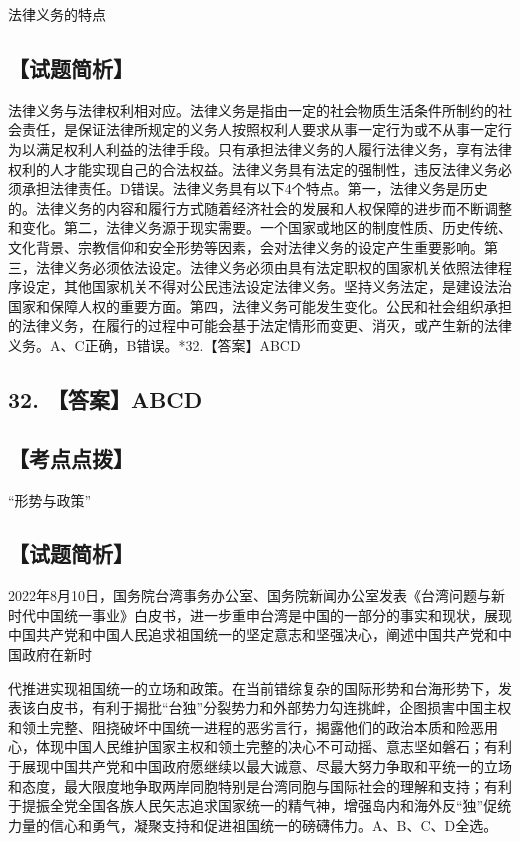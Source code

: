 \documentclass[UTF8,11pt]{ctexart}
\begin{document}
法律义务的特点


\subsection*{【试题简析】}

法律义务与法律权利相对应。法律义务是指由一定的社会物质生活条件所制约的社会责任，是保证法律所规定的义务人按照权利人要求从事一定行为或不从事一定行为以满足权利人利益的法律手段。只有承担法律义务的人履行法律义务，享有法律权利的人才能实现自己的合法权益。法律义务具有法定的强制性，违反法律义务必须承担法律责任。D错误。法律义务具有以下4个特点。第一，法律义务是历史的。法律义务的内容和履行方式随着经济社会的发展和人权保障的进步而不断调整和变化。第二，法律义务源于现实需要。一个国家或地区的制度性质、历史传统、文化背景、宗教信仰和安全形势等因素，会对法律义务的设定产生重要影响。第三，法律义务必须依法设定。法律义务必须由具有法定职权的国家机关依照法律程序设定，其他国家机关不得对公民违法设定法律义务。坚持义务法定，是建设法治国家和保障人权的重要方面。第四，法律义务可能发生变化。公民和社会组织承担的法律义务，在履行的过程中可能会基于法定情形而变更、消灭，或产生新的法律义务。A、C正确，B错误。*32.【答案】ABCD


\subsection*{32. 【答案】ABCD}

\subsection*{【考点点拨】}

“形势与政策”


\subsection*{【试题简析】}

2022年8月10日，国务院台湾事务办公室、国务院新闻办公室发表《台湾问题与新时代中国统一事业》白皮书，进一步重申台湾是中国的一部分的事实和现状，展现中国共产党和中国人民追求祖国统一的坚定意志和坚强决心，阐述中国共产党和中国政府在新时


代推进实现祖国统一的立场和政策。在当前错综复杂的国际形势和台海形势下，发表该白皮书，有利于揭批“台独”分裂势力和外部势力勾连挑衅，企图损害中国主权和领土完整、阻挠破坏中国统一进程的恶劣言行，揭露他们的政治本质和险恶用心，体现中国人民维护国家主权和领土完整的决心不可动摇、意志坚如磐石；有利于展现中国共产党和中国政府愿继续以最大诚意、尽最大努力争取和平统一的立场和态度，最大限度地争取两岸同胞特别是台湾同胞与国际社会的理解和支持；有利于提振全党全国各族人民矢志追求国家统一的精气神，增强岛内和海外反“独”促统力量的信心和勇气，凝聚支持和促进祖国统一的磅礴伟力。A、B、C、D全选。
\end{document}
